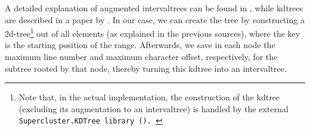 \documentclass[../thesis]{subfiles}
\begin{document}
A detailed explanation of augmented \glspl{intervaltree} can be found in \textcite[section~17.3]{cormen2022}, while \glspl{kdtree} are described in a paper by \textcite{bentley1975}.
In our case, we can create the tree by constructing a 2d-tree\footnote{
	Note that, in the actual implementation, the construction of the \gls{kdtree} (excluding its augmentation to an \gls{intervaltree}) is handled by the external \tt{Supercluster.KDTree} library ().
} out of all elements (as explained in the previous sources), where the key is the starting position of the \gls{range}.
Afterwards, we save in each node the maximum line number and maximum character offset, respectively, for the subtree rooted by that node, thereby turning this \gls{kdtree} into an \gls{intervaltree}.
\end{document}
